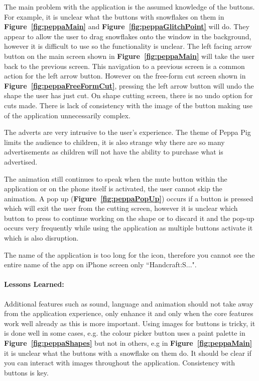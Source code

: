 \documentclass[11pt]{article}
\begin{document}
                The main problem with the application is the assumed knowledge of the buttons. For example, it is unclear what the buttons with snowflakes on them in \textbf{Figure~\ref{fig:peppaMain}} and \textbf{Figure~\ref{fig:peppaGlitchPoint}} will do. They appear to allow the user to drag snowflakes onto the window in the background, however it is difficult to use so the functionality is unclear. The left facing arrow button on the main screen shown in \textbf{Figure~\ref{fig:peppaMain}} will take the user back to the previous screen. This navigation to a previous screen is a common action for the left arrow button. However on the free-form cut screen shown in \textbf{Figure~\ref{fig:peppaFreeFormCut}}, pressing the left arrow button will undo the shape the user has just cut.
                 On shape cutting screen, there is no undo option for cuts made. There is lack of consistency with the image of the button making use of the application unnecessarily complex.
                
                The adverts are very intrusive to the user's experience. The theme of Peppa Pig limits the audience to children, it is also strange why there are so many advertisements as children will not have the ability to purchase what is advertised. 
                
                The animation still continues to speak when the mute button within the application or on the phone itself is activated, the user cannot skip the animation. A pop up (\textbf{Figure~\ref{fig:peppaPopUp}}) occurs if a button is pressed which will exit the user from the cutting screen, however it is unclear which button to press to continue working on the shape or to discard it and the pop-up occurs very frequently while using the application as multiple buttons activate it which is also disruption. 
                
                The name of the application is too long for the icon, therefore you cannot see the entire name of the app on iPhone screen only ``Handcraft:S...".
                
                \paragraph{Lessons Learned:}   
                Additional features such as sound, language and animation should not take away from the application experience, only enhance it and only when the core features work well already as this is more important. Using images for buttons is tricky, it is done well in some cases, e.g. the colour picker button uses a paint palette in \textbf{Figure~\ref{fig:peppaShapes}} but not in others, e.g in \textbf{Figure~\ref{fig:peppaMain}} it is unclear what the buttons with a snowflake on them do. It should be clear if you can interact with images throughout the application. Consistency with buttons is key.
                
\end{document}

